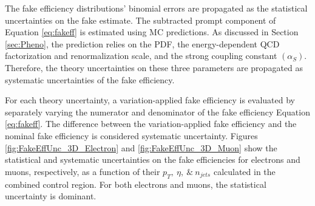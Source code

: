 The fake efficiency distributions' binomial errors are propagated as the statistical uncertainties on the fake estimate. The subtracted prompt component of Equation \ref{eq:fakeff} is estimated using MC predictions. As discussed in Section \ref{sec:Pheno}, the prediction relies on the PDF, the energy-dependent QCD factorization and renormalization scale, and the strong coupling constant $(\alpha_{S})$. Therefore, the theory uncertainties on these three parameters are propagated as systematic uncertainties of the fake efficiency. 

For each theory uncertainty, a variation-applied fake efficiency is evaluated by separately varying the numerator and denominator of the fake efficiency Equation \ref{eq:fakeff}. The difference between the variation-applied fake efficiency and the nominal fake efficiency is considered systematic uncertainty. Figures \ref{fig:FakeEffUnc_3D_Electron} and \ref{fig:FakeEffUnc_3D_Muon} show the statistical and systematic uncertainties on the fake efficiencies for electrons and muons, respectively, as a function of their $p_{T},~\eta,~\&~n_{jets}$ calculated in the combined control region. For both electrons and muons, the statistical uncertainty is dominant.

